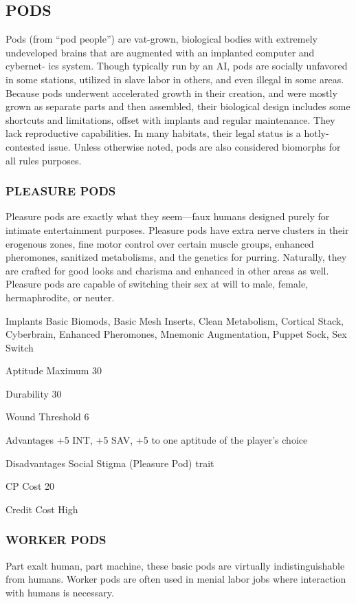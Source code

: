 \subsection{PODS}
Pods (from “pod people”) are vat-grown, biological bodies with extremely
undeveloped brains that are augmented with an implanted computer and cybernet-
ics system. Though typically run by an AI, pods are socially unfavored in some
stations, utilized in slave labor in others, and even illegal in some
areas. Because pods underwent accelerated growth in their creation, and were
mostly grown as separate parts and then assembled, their biological design
includes some shortcuts and limitations, offset with implants and regular
maintenance. They lack reproductive capabilities. In many habitats, their legal
status is a hotly-contested issue.  Unless otherwise noted, pods are also
considered biomorphs for all rules purposes.

\subsubsection{PLEASURE PODS}
Pleasure pods are exactly what they seem—faux humans designed purely for
intimate entertainment purposes. Pleasure pods have extra nerve clusters in
their erogenous zones, fine motor control over certain muscle groups, enhanced
pheromones, sanitized metabolisms, and the genetics for purring. Naturally,
they are crafted for good looks and charisma and enhanced in other areas as
well. Pleasure pods are capable of switching their sex at will to male, female,
hermaphrodite, or neuter.

\begin{description*}
\item[Implants] Basic Biomods, Basic Mesh Inserts, Clean Metabolism, Cortical
  Stack, Cyberbrain, Enhanced Pheromones, Mnemonic Augmentation, Puppet Sock,
  Sex Switch
\item[Aptitude Maximum] 30 
\item[Durability] 30 
\item[Wound Threshold] 6 
\item[Advantages] +5 INT, +5 SAV, +5 to one aptitude of the player’s choice 
\item[Disadvantages] Social Stigma (Pleasure Pod) trait 
\item[CP Cost] 20 
\item[Credit Cost] High 
\end{description*}

\subsubsection{WORKER PODS}
Part exalt human, part machine, these basic pods are virtually
indistinguishable from humans. Worker pods are often used in menial labor jobs
where interaction with humans is necessary.

